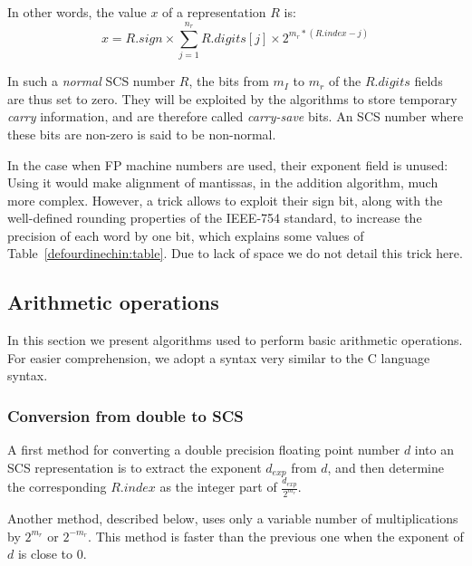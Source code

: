 In other words, the value  $x$ of a representation $R$  is:
\begin{equation}
\label{defourdinechin:eqn4}
x = R.sign \times \sum_{j=1}^{n_r} R.digits[j] \times 2^{m_r * (R.index - j)}
\end{equation}

In such a \emph{normal} SCS number $R$, the bits from $m_I$ to $m_r$
of the $R.digits$ fields are thus set to zero. They will be exploited
by the algorithms to store temporary \emph{carry} information, and are
therefore called \emph{carry-save} bits. An SCS number where these
bits are non-zero is said to be non-normal.


In the case when FP machine numbers are used, their exponent field is
unused: Using it would make alignment of mantissas, in the addition
algorithm, much more complex. However, a trick allows to exploit their
sign bit, along with the well-defined rounding properties of the
IEEE-754 standard, to increase the precision of each word by one bit,
which explains some values of Table~\ref{defourdinechin:table}. Due to lack of space
we do not detail this trick here.


\subsection{Arithmetic operations\label{defourdinechin:sec:ops}}

In this section we present algorithms used to perform basic arithmetic
operations. For easier comprehension, we adopt a syntax very similar
to the C language syntax.

\subsubsection{Conversion from double to SCS}
 A first method for converting a double precision floating
point number $d$ into an SCS representation is to extract the
exponent $d_{exp}$ from $d$, and then determine the corresponding
$R.index$ as the integer part of
$\frac{d_{exp}}{2^{m_r}}$.

Another method, described below, uses only a variable number of
multiplications by $2^{m_r}$ or $2^{-m_r}$. This method is faster than the previous
one when the exponent of $d$ is close to $0$.

